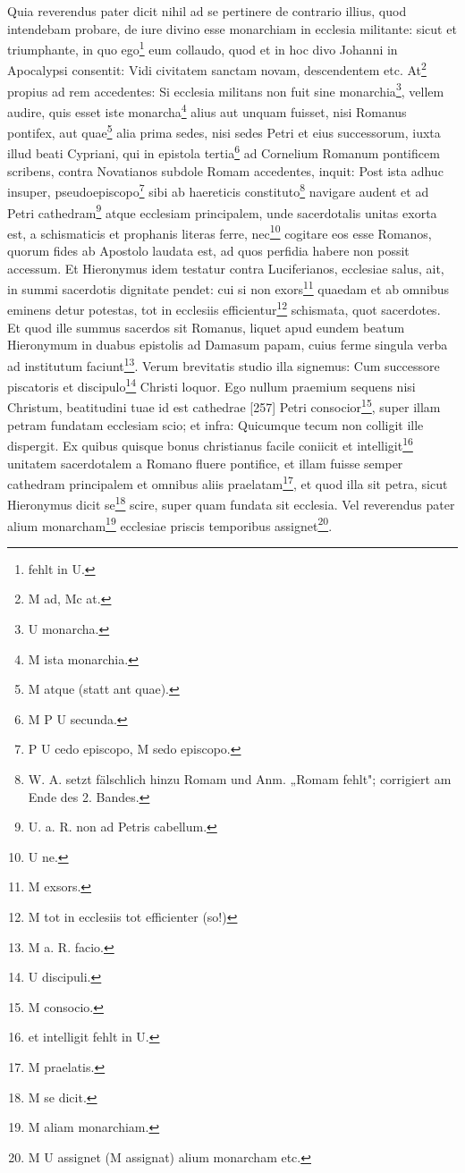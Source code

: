 Quia reverendus pater dicit nihil ad se pertinere de contrario illius, quod intendebam probare, de iure divino esse monarchiam in ecclesia militante: sicut et triumphante, in quo ego\footnote{fehlt in U.} eum collaudo, quod et in hoc divo Johanni in Apocalypsi consentit: Vidi civitatem sanctam novam, descendentem etc. At\footnote{M ad, Mc at.} propius ad rem accedentes: Si ecclesia militans non fuit sine monarchia\footnote{U monarcha.}, vellem audire, quis esset iste monarcha\footnote{M ista monarchia.} alius aut unquam fuisset, nisi Romanus pontifex, aut quae\footnote{M atque (statt ant quae).} alia prima sedes, nisi sedes Petri et eius successorum, iuxta illud beati Cypriani, qui in epistola tertia\footnote{M P U secunda.} ad Cornelium Romanum pontificem scribens, contra Novatianos subdole Romam accedentes, inquit: Post ista adhuc insuper, pseudoepiscopo\footnote{P U cedo episcopo, M sedo episcopo.} sibi ab haereticis constituto\footnote{W. A. setzt fälschlich hinzu Romam und Anm. „Romam fehlt"; corrigiert am Ende des 2. Bandes.} navigare audent et ad Petri cathedram\footnote{U. a. R. non ad Petris cabellum.} atque ecclesiam principalem, unde sacerdotalis unitas exorta est, a schismaticis et prophanis literas ferre, nec\footnote{U ne.} cogitare eos esse Romanos, quorum fides ab Apostolo laudata est, ad quos perfidia habere non possit accessum. Et Hieronymus idem testatur contra Luciferianos, ecclesiae salus, ait, in summi sacerdotis dignitate pendet: cui si non exors\footnote{M exsors.} quaedam et ab omnibus eminens detur potestas, tot in ecclesiis efficientur\footnote{M tot in ecclesiis tot efficienter (so!)} schismata, quot sacerdotes. Et quod ille summus sacerdos sit Romanus, liquet apud eundem beatum Hieronymum in duabus epistolis ad Damasum papam, cuius ferme singula verba ad institutum faciunt\footnote{M a. R. facio.}. Verum brevitatis studio illa signemus: Cum successore piscatoris et discipulo\footnote{U discipuli.} Christi loquor. Ego nullum praemium sequens nisi Christum, beatitudini tuae id est cathedrae [257] Petri consocior\footnote{M consocio.}, super illam petram fundatam ecclesiam scio; et infra: Quicumque tecum non colligit ille dispergit. Ex quibus quisque bonus christianus facile coniicit et intelligit\footnote{et intelligit fehlt in U.} unitatem sacerdotalem a Romano fluere pontifice, et illam fuisse semper cathedram principalem et omnibus aliis praelatam\footnote{M praelatis.}, et quod illa sit petra, sicut Hieronymus dicit se\footnote{M se dicit.} scire, super quam fundata sit ecclesia. Vel reverendus pater alium monarcham\footnote{M aliam monarchiam.} ecclesiae priscis temporibus assignet\footnote{M U assignet (M assignat) alium monarcham etc.}.


